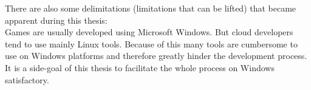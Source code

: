 There are also some delimitations (limitations that can be lifted) that became
apparent during this thesis:\\

Games are usually developed using Microsoft Windows. But cloud developers tend
to use mainly Linux tools. Because of this many tools are cumbersome to use on
Windows platforms and therefore greatly hinder the development process. It is a
side-goal of this thesis to facilitate the whole process on Windows
satisfactory.\\





















